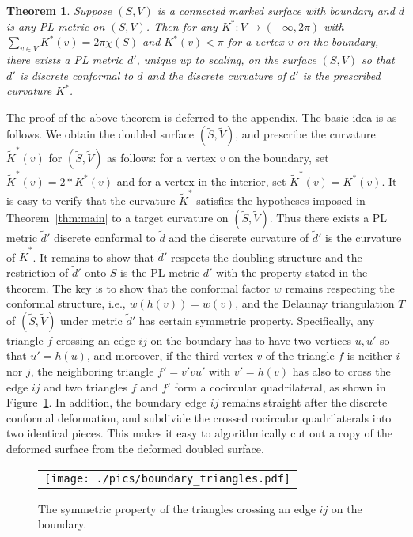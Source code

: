 \documentclass[11pt]{article}
\newtheorem{theorem}{Theorem}[section]
\begin{document}
\begin{theorem}
\label{theorem:dc_boundary} 
Suppose $(S, V)$ is a connected marked surface with 
boundary and $d$ is any PL metric on $(S, V)$. Then for any $K^*:V \to (-\infty, 2\pi)$ 
with $\sum_{v \in V} K^*(v) =2\pi \chi(S)$ and $K^*(v)<\pi$ for a vertex $v$ on the boundary, 
there exists a PL metric $d'$, unique up to scaling, on the surface $(S, V)$ 
so that $d'$ is discrete conformal to $d$ and the discrete curvature
of $d'$ is the prescribed curvature $K^*$. 
\end{theorem}

The proof of the above theorem is deferred to the appendix. The basic idea is as follows. 
We obtain the doubled surface $(\tilde{S}, \tilde{V})$, and prescribe the curvature $\tilde{K}^*(v)$ for $(\tilde{S}, \tilde{V})$ as 
follows: for a vertex $v$ on the boundary, set $\tilde{K}^*(v) = 2 * K^*(v)$ 
and for a vertex in the interior, set $\tilde{K}^*(v) =  K^*(v)$. 
It is easy to verify that the curvature $\tilde{K}^*$ satisfies the hypotheses imposed in Theorem~\ref{thm:main}
to a target curvature on $ (\tilde{S}, \tilde{V})$. Thus there exists a PL metric $\tilde{d}'$ discrete
conformal to $\tilde{d}$ and the discrete curvature of $\tilde{d}'$ is the curvature of $\tilde{K}^*$.
It remains to show that $\tilde{d}'$ respects the doubling structure and the restriction of $\tilde{d}'$ onto
$S$ is the PL metric $d'$ with the property stated in the theorem. The key is to show that the conformal 
factor $w$ remains respecting the conformal structure, i.e., $w(h(v)) = w(v)$, and the Delaunay triangulation $T$
of $(\tilde{S}, \tilde{V})$ under metric $\tilde{d}'$ has certain symmetric property. Specifically, 
any triangle $f$ crossing an edge $ij$ on the boundary has to
have two vertices $u, u'$ so that $u'=h(u)$, and moreover, if the third vertex $v$ of the 
triangle $f$ is neither $i$ nor $j$, the neighboring triangle $f' = v'vu'$ with $v'=h(v)$ has also to cross
the edge $ij$ and two triangles $f$ and $f'$ form a cocircular quadrilateral, as shown in Figure~\ref{fig:boundary_triangles}. 
In addition, the boundary edge $ij$ remains straight after the discrete conformal deformation, 
and subdivide the crossed cocircular quadrilaterals into two identical pieces. This makes it easy 
to algorithmically cut out a copy of the deformed surface from the deformed doubled surface. 

\begin{figure}[t]
\begin{center}
\begin{tabular}{c}
\texttt{[image: ./pics/boundary\_triangles.pdf]}
\end{tabular}
\end{center}
\vspace{-0.1in}
\caption{The symmetric property of the triangles crossing an edge $ij$
on the boundary.
\label{fig:boundary_triangles}}
\end{figure}
\end{document}
